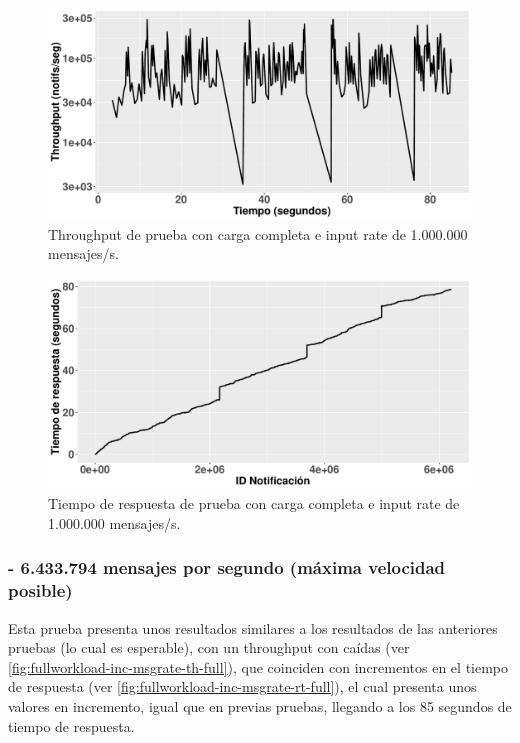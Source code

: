 \begin{figure}[htpb]
    \centering
    \includegraphics[width=\textwidth]{images/full-worklad-inc-msgrate/th_full-workload-inc-msgrate_1M.pdf}
    \caption{Throughput de prueba con carga completa e input rate de 1.000.000 mensajes/s.}
    \label{fig:fullworkload-inc-msgrate-th-1M}
\end{figure}

\begin{figure}[htpb]
    \centering
    \includegraphics[width=\textwidth]{images/full-worklad-inc-msgrate/rt_full-workload-inc-msgrate_1M.pdf}
    \caption{Tiempo de respuesta de prueba con carga completa e input rate de 1.000.000 mensajes/s.}
    \label{fig:fullworkload-inc-msgrate-rt-1M}
\end{figure}


\subsubsection*{- 6.433.794 mensajes por segundo (máxima velocidad posible)}

Esta prueba presenta unos resultados similares a los resultados de las anteriores
pruebas (lo cual es esperable), con un throughput con caídas
(ver \autoref{fig:fullworkload-inc-msgrate-th-full}), que coinciden
con incrementos en el tiempo de respuesta (ver 
\autoref{fig:fullworkload-inc-msgrate-rt-full}), el cual presenta unos valores
en incremento, igual que en previas pruebas, llegando a los 85 segundos de tiempo
de respuesta.


